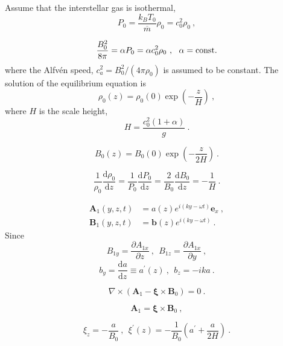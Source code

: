 \documentclass[12pt,a4paper]{article}
\renewcommand{\vec}[1]{\boldsymbol{#1}}
\newcommand{\dif}{\mathrm{d}}
\begin{document}
Assume that the interstellar gas is isothermal, 
\begin{equation*}
P_0 = \frac{k_B T_0}{\overline{m} } \rho_0 = c_0^2 \rho_0 ~,
\end{equation*}

\begin{equation}
\frac{B_0^2}{8\pi} = \alpha P_0 = \alpha c_0^2 \rho_0 ~, ~~ \alpha = {\rm const.} 
\end{equation}
where the Alfv\'en speed, $c_a^2 = B_0^2/(4\pi \rho_0)$ is assumed to be constant. The solution of the equilibrium equation is
\begin{equation*}
\rho_0(z) = \rho_0(0) \exp \left(-\frac{z}{H} \right) ~,
\end{equation*}
where $H$ is the scale height,
\begin{equation}
H = \frac{c_0^2 (1+\alpha)}{g} ~.
\end{equation}

\begin{equation}
B_0(z) = B_0(0) \exp \left(-\frac{z}{2H} \right) ~.
\end{equation}

\begin{equation}
\frac{1}{\rho_0} \dfrac{\dif \rho_0}{\dif z} = \frac{1}{P_0} \dfrac{\dif P_0}{\dif z} = \frac{2}{B_0} \dfrac{\dif B_0}{\dif z} = -\frac{1}{H} ~.
\end{equation}

\begin{align}
\vec{A}_1 (y,z,t) &= a(z) e^{i(ky-\omega t)} \vec{e}_x ~, \\
\vec{B}_1 (y,z,t) &= \vec{b}(z) e^{i(ky-\omega t)}  ~.
\end{align}
Since
\begin{equation}
B_{1y} = \frac{\partial A_{1x}}{\partial z} ~, ~~ B_{1z} = \frac{\partial A_{1x}}{\partial y} ~,
\end{equation}
\begin{equation}
b_y = \frac{\dif a}{\dif z} \equiv a^\prime(z) ~, ~~ b_z = -ika ~.
\end{equation}

\begin{equation*}
\nabla \times (\vec{A}_1 -\vec{\xi} \times \vec{B}_0) = 0 ~.
\end{equation*}

\begin{equation*}
\vec{A}_1 = \vec{\xi} \times \vec{B}_0 ~,
\end{equation*}

\begin{equation}
\xi_z = -\frac{a}{B_0} ~, ~~ \xi^\prime(z) = -\frac{1}{B_0} \left(a^\prime +\frac{a}{2H} \right) ~.
\end{equation}
\end{document}
